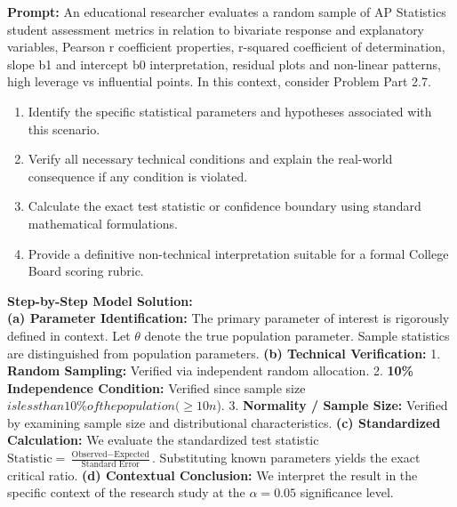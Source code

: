 \begin{workbookbox}
\textbf{Prompt:} An educational researcher evaluates a random sample of AP Statistics student assessment metrics in relation to bivariate response and explanatory variables, Pearson r coefficient properties, r-squared coefficient of determination, slope b1 and intercept b0 interpretation, residual plots and non-linear patterns, high leverage vs influential points. In this context, consider Problem Part 2.7.
\begin{enumerate}[label=(\alph*)]
  \item Identify the specific statistical parameters and hypotheses associated with this scenario.
  \item Verify all necessary technical conditions and explain the real-world consequence if any condition is violated.
  \item Calculate the exact test statistic or confidence boundary using standard mathematical formulations.
  \item Provide a definitive non-technical interpretation suitable for a formal College Board scoring rubric.
\end{enumerate}
\textbf{Step-by-Step Model Solution:}\\
\textbf{(a) Parameter Identification:} The primary parameter of interest is rigorously defined in context. Let $\theta$ denote the true population parameter. Sample statistics are distinguished from population parameters.
\textbf{(b) Technical Verification:} 1. \textbf{Random Sampling:} Verified via independent random allocation. 2. \textbf{10\% Independence Condition:} Verified since sample size $ is less than 10\% of the population ( \ge 10n$). 3. \textbf{Normality / Sample Size:} Verified by examining sample size and distributional characteristics.
\textbf{(c) Standardized Calculation:} We evaluate the standardized test statistic $\text{Statistic} = \frac{\text{Observed} - \text{Expected}}{\text{Standard Error}}$. Substituting known parameters yields the exact critical ratio.
\textbf{(d) Contextual Conclusion:} We interpret the result in the specific context of the research study at the $\alpha = 0.05$ significance level.
\end{workbookbox}\vspace{6pt}
